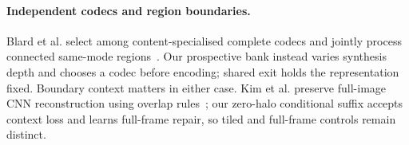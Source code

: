 \paragraph{Independent codecs and region boundaries.}
Blard et al. select among content-specialised complete codecs and
jointly process connected same-mode regions~\cite{blard2026spatial}.
Our prospective bank instead varies synthesis depth and chooses a
codec before encoding; shared exit holds the representation fixed.
Boundary context matters in either case. Kim et al. preserve full-image
CNN reconstruction using overlap rules~\cite{kim2026blockwise};
our zero-halo conditional suffix accepts context loss and learns
full-frame repair, so tiled and full-frame controls remain distinct.
